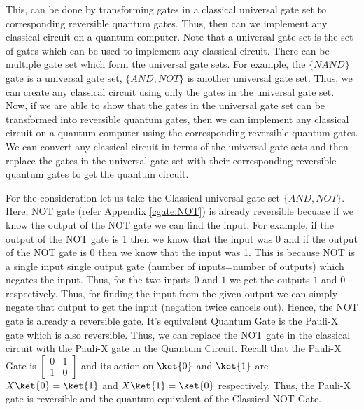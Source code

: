 \documentclass[12pt, oneside]{book}
\theoremstyle{definition}
\theoremstyle{definition}
\theoremstyle{remark}
\begin{document}
This, can be done by transforming gates in a classical universal gate set to corresponding reversible quantum gates. Thus, then can we implement any classical circuit on a quantum computer. 
Note that a universal gate set is the set of gates which can be used to implement any classical circuit. There can be multiple gate set which form the universal gate sets. For example, the $\{NAND\}$ gate is a universal gate set,
$\{AND, NOT\}$ is another universal gate set. Thus, we can create any classical circuit using only the gates in the universal gate set. Now, if we are able to show that 
the gates in the universal gate set can be transformed into reversible quantum gates, then we can implement any classical circuit on a quantum computer using the corresponding reversible quantum gates. We can convert any classical circuit in terms of the universal gate sets and then 
replace the gates in the universal gate set with their corresponding reversible quantum gates to get the quantum circuit.

For the consideration let us take the Classical universal gate set $\{AND,NOT\}$. Here, NOT gate (refer Appendix \ref{cgate:NOT}) is already reversible 
becuase if we know the output of the NOT gate we can find the input. For example, if the output of the NOT gate is 1 then we know that the input was 0 and if the output of the NOT gate is 0 then we know that the input was 1. This is because NOT is a single input single output gate (number of inputs=number of outputs)
which negates the input. Thus, for the two inputs $0$ and $1$ we get the outputs $1$ and $0$ respectively. Thus, for finding the input from the given output we can simply negate that output to get the input (negation twice cancels out). Hence, the NOT gate is already a reversible gate. 
It's equivalent Quantum Gate is the Pauli-X gate which is also reversible. Thus, we can replace the NOT gate in the classical circuit with the Pauli-X gate in the Quantum Circuit.
Recall that the Pauli-X Gate is $\begin{bmatrix} 0 & 1 \\ 1 & 0 \end{bmatrix}$ and its action on $\ket{0}$ and $\ket{1}$ are $X\ket{0}=\ket{1}$ and $X\ket{1}=\ket{0}$
respectively. Thus, the Pauli-X gate is reversible and the quantum equivalent of the Classical NOT Gate.
\end{document}
